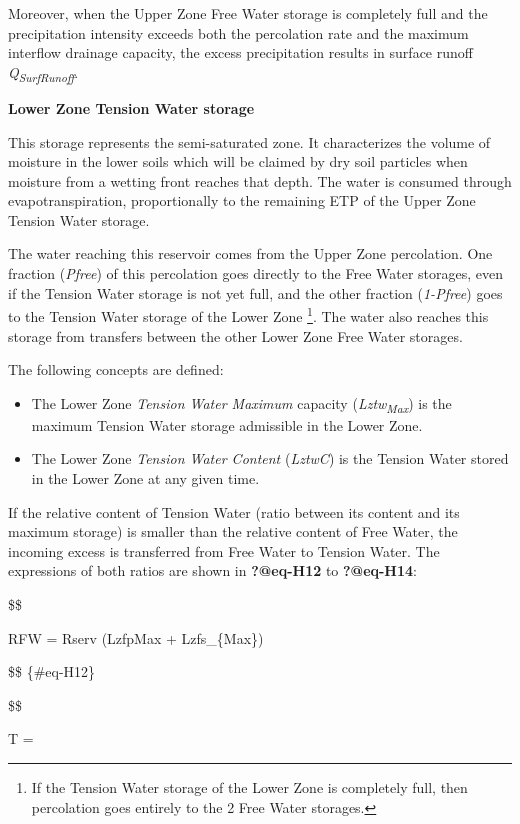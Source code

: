 \documentclass[
  letterpaper,
  DIV=11,
  numbers=noendperiod]{scrreprt}
\begin{document}
Moreover, when the Upper Zone Free Water storage is completely full and
the precipitation intensity exceeds both the percolation rate and the
maximum interflow drainage capacity, the excess precipitation results in
surface runoff \emph{Q\textsubscript{SurfRunoff}}.

\textbf{Lower Zone Tension Water storage}

This storage represents the semi-saturated zone. It characterizes the
volume of moisture in the lower soils which will be claimed by dry soil
particles when moisture from a wetting front reaches that depth. The
water is consumed through evapotranspiration, proportionally to the
remaining ETP of the Upper Zone Tension Water storage.

The water reaching this reservoir comes from the Upper Zone percolation.
One fraction (\emph{Pfree}) of this percolation goes directly to the
Free Water storages, even if the Tension Water storage is not yet full,
and the other fraction (\emph{1-Pfree}) goes to the Tension Water
storage of the Lower Zone \footnote{If the Tension Water storage of the
  Lower Zone is completely full, then percolation goes entirely to the 2
  Free Water storages.}. The water also reaches this storage from
transfers between the other Lower Zone Free Water storages.

The following concepts are defined:

\begin{itemize}
\item
  The Lower Zone \emph{Tension Water Maximum} capacity
  (\emph{Lztw\textsubscript{Max}}) is the maximum Tension Water storage
  admissible in the Lower Zone.
\item
  The Lower Zone \emph{Tension Water Content} (\emph{LztwC}) is the
  Tension Water stored in the Lower Zone at any given time.
\end{itemize}

If the relative content of Tension Water (ratio between its content and
its maximum storage) is smaller than the relative content of Free Water,
the incoming excess is transferred from Free Water to Tension Water. The
expressions of both ratios are shown in \textbf{?@eq-H12} to
\textbf{?@eq-H14}:

\$\$

RFW = Rserv \cdot (LzfpMax + Lzfs\_\{Max\})

\$\$ \{\#eq-H12\}

\$\$

T = 
\end{document}
